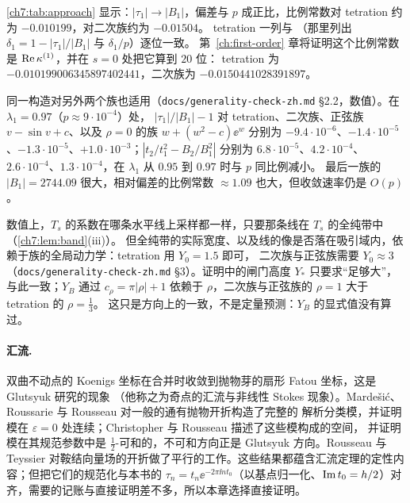 \cref{ch7:tab:approach} 显示：$|\tau_1|\to|B_1|$，偏差与 $p$ 成正比，比例常数对 tetration 约为 $-0.010199$，对二次族约为 $-0.01504$。
tetration 一列与 \cite[表~4]{KneserPaper}（那里列出 $\delta_1=1-|\tau_1|/|B_1|$ 与 $\delta_1/p$）逐位一致。
第~\ref{ch:first-order} 章将证明这个比例常数是 $\operatorname{Re}\kappa^{(1)}$，并在 $s=0$ 处把它算到 $20$ 位：
tetration 为 $-0.010199006345897402441$，二次族为 $-0.0150441028391897$。

同一构造对另外两个族也适用（\texttt{docs/generality-check-zh.md} §2.2，数值）。在 $\lambda_1=0.97$（$p\approx9\cdot10^{-4}$）处，
$|\tau_1|/|B_1|-1$ 对 tetration、二次族、正弦族 $v-\sin v+c$、以及 $\rho=0$ 的族 $w+(w^2-c)\ee^w$ 分别为
$-9.4\cdot10^{-6}$、$-1.4\cdot10^{-5}$、$-1.3\cdot10^{-5}$、$+1.0\cdot10^{-3}$；$|t_2/t_1^2-B_2/B_1^2|$ 分别为
$6.8\cdot10^{-5}$、$4.2\cdot10^{-4}$、$2.6\cdot10^{-4}$、$1.3\cdot10^{-4}$，在 $\lambda_1$ 从 $0.95$ 到 $0.97$ 时与 $p$ 同比例减小。
最后一族的 $|B_1|=2744.09$ 很大，相对偏差的比例常数 $\approx1.09$ 也大，但收敛速率仍是 $O(p)$。

\begin{remark}[采样线的位置]\label{ch7:rem:sampling}
数值上，$T_s$ 的系数在哪条水平线上采样都一样，只要那条线在 $T_s$ 的全纯带中（\cref{ch7:lem:band}(iii)）。
但全纯带的实际宽度、以及线的像是否落在吸引域内，依赖于族的全局动力学：tetration 用 $Y_0=1.5$ 即可，
二次族与正弦族需要 $Y_0\approx3$（\texttt{docs/generality-check-zh.md} §3）。证明中的闸门高度 $Y_*$ 只要求``足够大''，
与此一致；$Y_B$ 通过 $c_\rho=\pi|\rho|+1$ 依赖于 $\rho$，二次族与正弦族的 $\rho=1$ 大于 tetration 的 $\rho=\frac13$。
这只是方向上的一致，不是定量预测：$Y_B$ 的显式值没有算过。
\end{remark}

\notes

\paragraph{汇流.}
双曲不动点的 Koenigs 坐标在合并时收敛到抛物芽的扇形 Fatou 坐标，这是 Glutsyuk \cite{Glutsyuk2001} 研究的现象
（他称之为奇点的汇流与非线性 Stokes 现象）。Mardešić、Roussarie 与 Rousseau \cite{MRR2004} 对一般的通有抛物开折构造了完整的
解析分类模，并证明模在 $\varepsilon=0$ 处连续；Christopher 与 Rousseau \cite{ChristopherRousseau} 描述了这些模构成的空间，
并证明模在其规范参数中是 $\frac12$-可和的，不可和方向正是 Glutsyuk 方向。Rousseau 与 Teyssier \cite{RousseauTeyssier2008}
对鞍结向量场的开折做了平行的工作。这些结果都蕴含汇流定理的定性内容；但把它们的规范化与本书的
$\tau_n=t_n\ee^{-2\pi\ii nt_0}$（以基点归一化、$\operatorname{Im} t_0=h/2$）对齐，需要的记账与直接证明差不多，所以本章选择直接证明。

